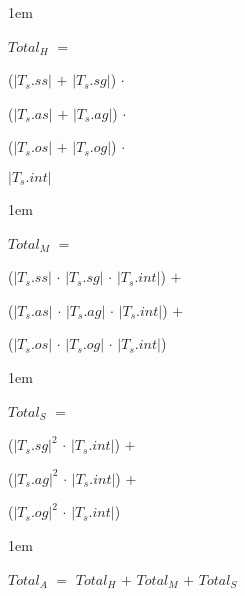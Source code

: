 \documentclass[11pt]{report}
\newenvironment{vquote}
{
  \begin{list}{}{\leftmargin 1em}\item[]
}
{
  \end{list}
}
\begin{document}
        \begin{vquote}
          $Total_H$ $=$

          \hspace{1em}
          ($|T_s.ss|$ $+$ $|T_s.sg|$) $\cdot$

          \hspace{1em}
          ($|T_s.as|$ $+$ $|T_s.ag|$) $\cdot$

          \hspace{1em}
          ($|T_s.os|$ $+$ $|T_s.og|$) $\cdot$

          \hspace{1em}
          $|T_s.int|$
        \end{vquote}

        \begin{vquote}
          $Total_M$ $=$

          \hspace{1em}
          ($|T_s.ss|$ $\cdot$ $|T_s.sg|$ $\cdot$ $|T_s.int|$) $+$

          \hspace{1em}
          ($|T_s.as|$ $\cdot$ $|T_s.ag|$ $\cdot$ $|T_s.int|$) $+$

           \hspace{1em}
          ($|T_s.os|$ $\cdot$ $|T_s.og|$ $\cdot$ $|T_s.int|$)
        \end{vquote}

        \begin{vquote}
          $Total_S$ $=$

          \hspace{1em}
          ($|T_s.sg|^2$ $\cdot$ $|T_s.int|$) $+$

          \hspace{1em}
          ($|T_s.ag|^2$ $\cdot$ $|T_s.int|$) $+$

           \hspace{1em}
          ($|T_s.og|^2$ $\cdot$ $|T_s.int|$)
        \end{vquote}

        \begin{vquote}
          $Total_A$ $=$ $Total_H$ $+$ $Total_M$ $+$ $Total_S$
        \end{vquote}
\end{document}

